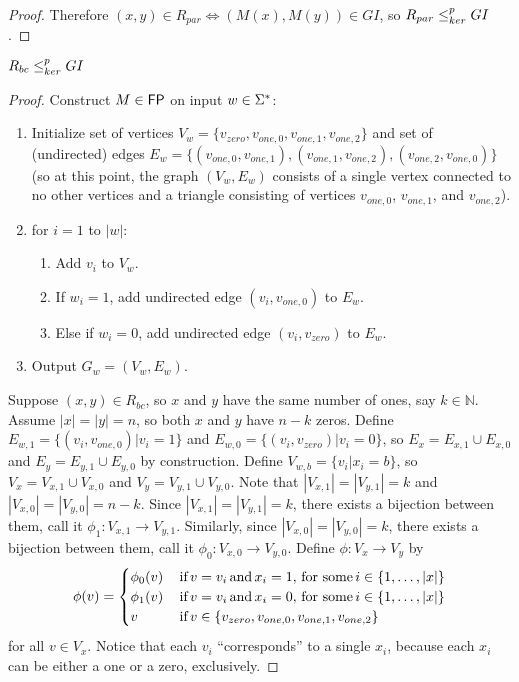 \begin{proof}
  Therefore $(x, y)\in R_{par} \iff (M(x), M(y)) \in GI$, so $R_{par} \leq^{p}_{ker} GI$.
\end{proof}

\begin{theorem}\label{thm:rbc-gi}$R_{bc}\leq^{p}_{ker} GI$\end{theorem}
\begin{proof}
  Construct $M\in {\ensuremath{\mathsf{FP}}}$ on input $w \in \Sigma^{*}$:
  \begin{enumerate}
  \item Initialize set of vertices $V_w=\{v_{zero}, v_{one,0}, v_{one,1},
    v_{one,2}\}$ and set of (undirected) edges $E_w=\{(v_{one,0}, v_{one,1}),
    (v_{one,1}, v_{one,2}), (v_{one,2}, v_{one,0})\}$ (so at this point, the
    graph $(V_w, E_w)$ consists of a single vertex connected to no other
    vertices and a triangle consisting of vertices $v_{one,0}$, $v_{one,1}$,
    and $v_{one,2}$).
  \item for $i=1$ to $|w|$:
    \begin{enumerate}
    \item Add $v_i$ to $V_w$.
    \item If $w_i = 1$, add undirected edge $(v_i, v_{one,0})$ to $E_w$.
    \item Else if $w_i = 0$, add undirected edge $(v_i, v_{zero})$ to $E_w$.
    \end{enumerate}
  \item Output $G_w=(V_w, E_w)$.
  \end{enumerate}
  
  Suppose $(x, y)\in R_{bc}$, so $x$ and $y$ have the same number of ones, say
  $k\in\mathbb{N}$. Assume $|x|=|y|=n$, so both $x$ and $y$ have $n-k$
  zeros. Define $E_{w,1}=\{(v_i, v_{one,0})|v_i = 1\}$ and $E_{w,0}=\{(v_i,
  v_{zero})|v_i = 0\}$, so $E_x = E_{x,1}\cup E_{x,0}$ and $E_y = E_{y,1} \cup
  E_{y,0}$ by construction. Define $V_{w,b}=\{v_i|x_i=b\}$, so $V_x=V_{x,1}
  \cup V_{x,0}$ and $V_y=V_{y,1} \cup V_{y,0}$. Note that
  $|V_{x,1}|=|V_{y,1}|=k$ and $|V_{x,0}|=|V_{y,0}|=n-k$. Since
  $|V_{x,1}|=|V_{y,1}|=k$, there exists a bijection between them, call it
  $\phi_1:V_{x,1}\to V_{y,1}$. Similarly, since $|V_{x,0}|=|V_{y,0}|=k$, there
  exists a bijection between them, call it $\phi_0:V_{x,0}\to V_{y,0}$. Define
  $\phi:V_x\to V_y$ by 
  \begin{displaymath}
    \phi(v) = 
    \begin{cases}
      \phi_0(v) & \,\text{if}\, v = v_i \,\text{and}\, x_i = 1, \,\text{for some}\, i\in\{1,\ldots,|x|\}\\
      \phi_1(v) & \,\text{if}\, v = v_i \,\text{and}\, x_i = 0, \,\text{for some}\, i\in\{1,\ldots,|x|\}\\
      v & \,\text{if}\, v \in \{v_{zero}, v_{one,0}, v_{one,1}, v_{one,2}\}
    \end{cases}
  \end{displaymath}
  for all $v\in V_x$. Notice that each $v_i$ ``corresponds'' to a
  single $x_i$, because each $x_i$ can be either a one or a zero,
  exclusively.


\end{proof}
